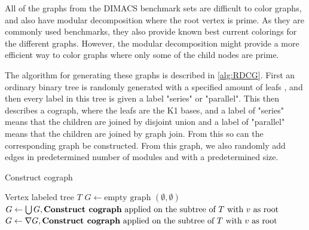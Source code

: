 \documentclass[a4paper]{article}
\begin{document}
All of the graphs from the DIMACS benchmark sets are difficult to color graphs,
and also have modular decomposition where the root vertex is prime. As they are
commonly used benchmarks, they also provide known best current colorings for the
different graphs. However, the modular decomposition might provide a more
efficient way to color graphs where only some of the child nodes are prime. 

The algorithm for generating these graphs is described in \autoref{alg:RDCG}.
First an ordinary binary tree is randomly generated with a specified amount of
leafs , and then every label in this tree is given a label "series" or
"parallel".  This then describes a cograph, where the leafs are the K1 bases,
and a label of "series" means that the children are joined by disjoint union and
a label of "parallel" means that the children are joined by graph join.  From
this so can the corresponding graph be constructed. From this graph, we also
randomly add edges in predetermined number of modules and with a predetermined
size. 

\begin{algorithm}[H]
    \caption{Construct cograph}
   \begin{algorithmic}[1]
        \REQUIRE Vertex labeled tree $T$
        \ENDIF
        \STATE $G \leftarrow \text{empty graph $(\emptyset,\emptyset)$}$
                \STATE $G \leftarrow \bigcup G, \text{\textbf{Construct cograph} applied
                on the subtree of $T$ with $v$ as root} $
                \STATE $G \leftarrow \nabla G, \text{\textbf{Construct cograph} applied
                on the subtree of $T$ with $v$ as root}$
            \ENDIF
        \ENDFOR
    \end{algorithmic}
\end{algorithm}
\end{document}
